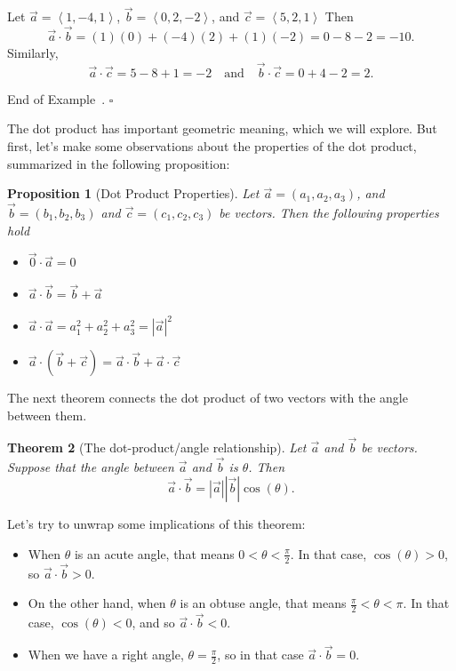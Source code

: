 \documentclass[10pt]{article}
\newtheorem{theorem}{Theorem}
\newtheorem{proposition}[theorem]{Proposition}
\theoremstyle{definition}
\newtheorem{example}[theorem]{Example}
\renewenvironment{example}
{\begin{oldexample}}
  {\par\smallskip\hfill   End of Example~\theexample. $\square$    \par\end{oldexample}}
\newcommand{\1}[1]{\textbf{1}_{\left[#1\right]}} %
\begin{document}
\begin{example}
  Let $\vec{a} = \left\langle 1,-4,1 \right\rangle$, $\vec{b} = \left\langle 0,2,-2 \right\rangle$, and
  $\vec{c} = \left\langle 5,2,1 \right\rangle $
  Then
  \begin{equation*}
    \vec{a} \cdot \vec{b} = (1)(0)+ (-4)(2)+(1)(-2) = 0-8-2 = -10.
  \end{equation*}
  Similarly,
  \begin{equation*}
    \vec{a}\cdot \vec{c} = 5-8+1 = -2
    \quad \text{and} \quad
    \vec{b} \cdot \vec{c} = 0 +4-2 = 2.
  \end{equation*}
\end{example}

The dot product has important geometric meaning, which we will explore. But first, let's make some
observations about the properties of the dot product, summarized in the following proposition:

\begin{proposition}[Dot Product Properties]
  Let $\vec{a}=(a_{1},a_{2},a_{3})$, and $\vec{b} = (b_{1},b_{2},b_{3})$ and
  $\vec{c}=(c_{1},c_{2},c_{3})$ be vectors. Then the following properties hold
  \begin{itemize}
    \item $\vec{0} \cdot \vec{a} = 0$
    \item $\vec{a}\cdot \vec{b} = \vec{b} + \vec{a}$ 
    \item $\vec{a}\cdot \vec{a} = a_{1}^{2}+a_{2}^{2}+a_{3}^{2} = |\vec{a}|^{2}$ 
    \item $\vec{a}\cdot (\vec{b}+\vec{c}) = \vec{a}\cdot \vec{b} + \vec{a} \cdot\vec{c} $
  \end{itemize}
\end{proposition}

The next theorem connects the dot product of two vectors with the angle between them.

\begin{theorem}[The dot-product/angle relationship]
  \label{thm:dot-productangle-relationship}
  Let $\vec{a}$ and $\vec{b}$ be vectors. Suppose that the angle between $\vec{a}$ and $\vec{b}$ is
  $\theta$. Then
  \begin{equation*}
    \vec{a}\cdot \vec{b} = | \vec{a} | |\vec{b}| \cos(\theta).
  \end{equation*}
\end{theorem}
Let's try to unwrap some implications of this theorem:
\begin{itemize}
  \item When $\theta$ is an acute angle, that means $0 < \theta < \frac{\pi}{2}$. In that case, $\cos(\theta)>0$,
  so $\vec{a}\cdot \vec{b} >0$.
  \item On the other hand, when $\theta $ is an obtuse angle, that means $\frac{\pi}{2}< \theta < \pi$.
  In that case, $\cos(\theta)<0$, and so $\vec{a}\cdot \vec{b} <0$.
  \item When we have a right angle, $\theta=\frac{\pi}{2}$, so in that case $\vec{a}\cdot \vec{b} =0$. 
\end{itemize}
\newpage
\end{document}

